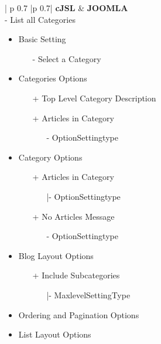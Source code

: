 \begin{minipage}{0.7\textwidth}
\begin{longtable}{| p {0.7\textwidth} |p {0.7\textwidth}|}
\hline
\textbf{cJSL} 
&  
\textbf{JOOMLA} \\ - List all Categories
  \begin{itemize}
    \item Basic  Setting 
   		\begin{enumerate}
   			\item[-] Select a Category
   		\end{enumerate}
   	\item Categories Options
	   	\begin{enumerate}
	    \item[+] Top Level Category Description
	    \item[+] Articles in Category 
	    	  \begin{enumerate}
	    			 \item[-] OptionSettingtype
	    	\end{enumerate}
	   \end{enumerate}
   	\item Category Options
   	\begin{enumerate}
   	\item[+] Articles in Category
   		\begin{enumerate}
   			\item[|-] OptionSettingtype
   		\end{enumerate}
   	\item[+] No Articles Message
   		\begin{enumerate}
   			\item[-] OptionSettingtype
   		\end{enumerate} 
   	\end{enumerate}
   	\item Blog Layout Options
   		\begin{enumerate}
   	   			\item[+] Include Subcategories
   			         \begin{enumerate}
   			          \item[|-] MaxlevelSettingType
   			         \end{enumerate}
   	   		\end{enumerate}
   	\item Ordering and Pagination Options
   	\item List Layout Options
   	\begin{enumerate}

\end{enumerate}
\end{itemize}
\end{longtable}
\end{minipage}
